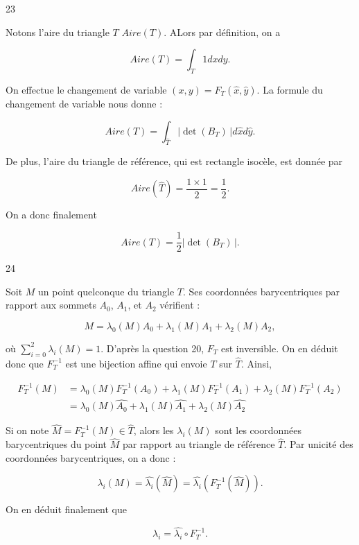 
\begin{reponse}{23}

Notons l'aire du triangle $T$ $Aire(T)$. ALors par définition, on a

\[
    Aire(T)= \int_T 1 dxdy.
\]

On effectue le changement de variable $(x,y)= F_T(\hat{x}, \hat{y})$. La formule du changement de variable nous donne :

\[
    Aire(T) = \int_{\hat{T}} \vert \det(B_T) \, \vert d\hat{x}d\hat{y}.
\]

De plus, l'aire du triangle de référence, qui est rectangle isocèle, est donnée par

\[
    Aire(\hat{T})= \frac{1 \times 1}{2} = \frac{1}{2}.
\]

On a donc finalement

\[
    Aire(T)=\frac{1}{2} \vert \det(B_T) \, \vert.
\]

\end{reponse}


\begin{reponse}{24}

Soit $M$ un point quelconque du triangle $T$. Ses coordonnées barycentriques par rapport aux sommets $A_0$, $A_1$, et $A_2$ vérifient :

\[
    M = \lambda_0(M)A_0+\lambda_1(M)A_1 + \lambda_2(M)A_2,
\]

où $\sum_{i=0}^2 \lambda_i(M) = 1$. D'après la question 20, $F_T$ est inversible. On en déduit donc que $F_T^{-1}$ est une bijection affine qui envoie $T$ sur $\hat{T}$. Ainsi, 

\begin{align*}
    F_T^{-1}(M) & =\lambda_0(M)F_T^{-1}(A_0)+\lambda_1(M)F_T^{-1}(A_1) + \lambda_2(M)F_T^{-1}(A_2) \\
    & = \lambda_0(M)\hat{A_0}+\lambda_1(M)\hat{A_1} + \lambda_2(M)\hat{A_2}
\end{align*}

Si on note $\hat{M} = F_T^{-1}(M) \in \hat{T}$, alors les $\lambda_i(M)$ sont les coordonnées barycentriques du point $\hat{M}$ par rapport au triangle de référence $\hat{T}$. Par unicité des coordonnées barycentriques, on a donc :

\[
    \lambda_i(M) = \hat{\lambda_i}(\hat{M}) = \hat{\lambda_i}(F_T^{-1}(\hat{M})).
\]

On en déduit finalement que 

\[
    \lambda_i = \hat{\lambda_i} \circ F_T^{-1}.
\]

\end{reponse}

